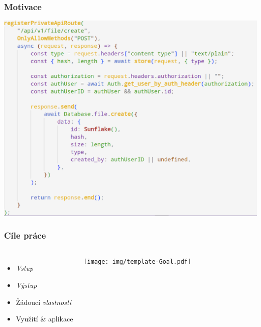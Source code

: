 \begin{frame}
  \frametitle{Motivace}
  \begin{center}
    \includegraphics[width=\textwidth]{img/01-scary-screenshot-4.png}
  \end{center}
\end{frame}







\begin{frame}
  \frametitle{Cíle práce}
  \begin{columns}
    \begin{itemize}
        \item \emph{Vstup}
        \item \emph{Výstup}
        \item Žádoucí \emph{vlastnosti}
        \item Využití \& aplikace
    \end{itemize}
     
        \texttt{[image: img/template-Goal.pdf]}
  \end{columns}
\end{frame}


